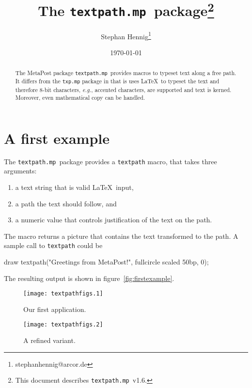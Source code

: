 \documentclass{article}
\newcommand*{\cmd}[1]{\texttt{#1}}
\newcommand*{\pkg}{\cmd{textpath.mp}}
\newenvironment{listing}{%
  \small%
  \verbatim%
}{%
  \endverbatim%
}
\begin{document}
\title{The \pkg\ package\thanks{This document describes \pkg\ v1.6.}}
\author{Stephan Hennig\thanks{stephanhennig@arcor.de}}
\date{\today}
\maketitle

\begin{abstract}
The MetaPost package \pkg\ provides macros to typeset text along a free path.  It differs from the \cmd{txp.mp} package in that is uses \LaTeX\ to typeset the text and therefore 8-bit characters, \emph{e.g.}, accented characters, are supported and text is kerned.  Moreover, even mathematical copy can be handled.
\end{abstract}

\suppressfloats


\section{A first example}\label{sec:firstexample}
The \pkg\ package provides a \cmd{textpath} macro, that takes three arguments:
\begin{enumerate}
\item a text string that is valid \LaTeX\ input,
\item a path the text should follow, and
\item a numeric value that controls justification of the text on the path.
\end{enumerate}
The macro returns a picture that contains the text transformed to the path.  A sample call to \cmd{textpath} could be

\begin{listing}
draw textpath("Greetings from MetaPost!", fullcircle scaled 50bp, 0);
\end{listing}

The resulting output is shown in figure~\ref{fig:firstexample}.
\begin{figure}
\begin{minipage}[t]{.45\linewidth}
  \centering
  \texttt{[image: textpathfigs.1]}
  \caption{Our first application.}
  \label{fig:firstexample}
\end{minipage}\hfill
\begin{minipage}[t]{.45\linewidth}
  \centering
  \texttt{[image: textpathfigs.2]}
  \caption{A refined variant.}
  \label{fig:secondexample}
\end{minipage}
\end{figure}
\end{document}

